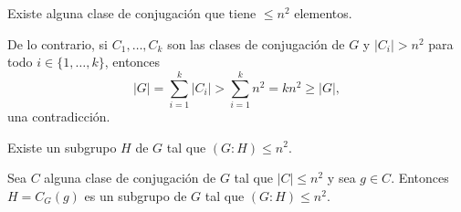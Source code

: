 \begin{claim}
Existe alguna clase de conjugación que tiene $\leq n^2$ elementos.
\end{claim}

De lo contrario, si $C_1,\dots,C_k$ son las clases de conjugación de $G$ y 
$|C_i|>n^2$ para todo $i\in\{1,\dots,k\}$, entonces 
\[
|G|=\sum_{i=1}^k|C_i|>\sum_{i=1}^kn^2=kn^2\geq |G|,
\]
una contradicción. 

\begin{claim}
Existe un subgrupo $H$ de $G$ tal que $(G:H)\leq n^2$.
\end{claim}

Sea $C$ alguna clase de conjugación de $G$ tal que $|C|\leq n^2$ y sea $g\in C$.  
Entonces $H=C_G(g)$ es un subgrupo de $G$ tal que $(G:H)\leq n^2$. 
